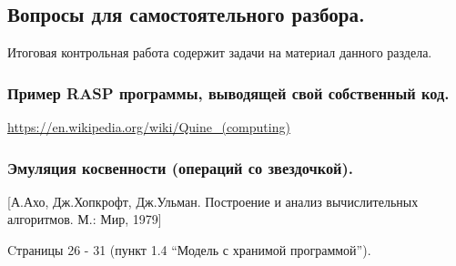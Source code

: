 \documentclass[a4paper, 12pt]{extarticle}
\newcommand{\AhoUlman}{[А.Ахо, Дж.Хопкрофт, Дж.Ульман. Построение и анализ вычислительных алгоритмов. М.: Мир, 1979]}
\begin{document}
\subsection*{Вопросы для самостоятельного разбора.}
Итоговая контрольная работа содержит задачи на материал данного раздела.

\subsubsection*{Пример RASP программы, выводящей свой собственный код.}
\url{https://en.wikipedia.org/wiki/Quine_(computing)}

\subsubsection*{Эмуляция косвенности (операций со звездочкой).}
\AhoUlman

Cтраницы 26 - 31 (пункт 1.4 ``Модель с хранимой программой'').
\end{document}
